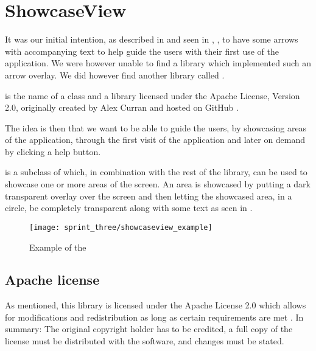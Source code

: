 
\section{ShowcaseView}
\label{sec:showcaseview}

It was our initial intention, as described in  and seen in , , to have some arrows with accompanying text to help guide the users with their first use of the application. We were however unable to find a library which implemented such an arrow overlay. We did however find another library called . 

 is the name of a class and a library licensed under the Apache License, Version 2.0, originally created by Alex Curran and hosted on GitHub \parencite{showcaseview_by_alex_curran}. %

The idea is then that we want to be able to guide the users, by showcasing areas of the application, through the first visit of the application and later on demand by clicking a help button. 

 is a subclass of  which, in combination with the rest of the library, can be used to showcase one or more areas of the screen. An area is showcased by putting a dark transparent overlay over the screen and then letting the showcased area, in a circle, be completely transparent along with some text as seen in .

\begin{figure}[!htbp]
    \centering
    \texttt{[image: sprint\_three/showcaseview\_example]}
    \caption{Example of the }
    \label{fig:showcaseview_example}
\end{figure}

\subsection{Apache license}
As mentioned, this library is licensed under the Apache License 2.0 which allows for modifications and redistribution as long as certain requirements are met \parencite{apache2license}. In summary: The original copyright holder has to be credited, a full copy of the license must be distributed with the software, and changes must be stated.

